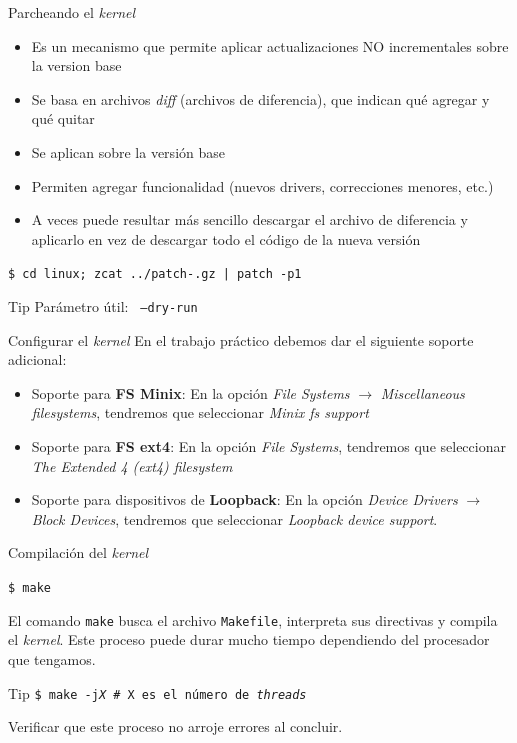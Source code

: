 \begin{frame}{Parcheando el \textit{kernel}}
\begin{itemize}
\item Es un mecanismo que permite aplicar actualizaciones NO incrementales sobre la version base
\item Se basa en archivos \textit{diff} (archivos de diferencia), que indican qué agregar y qué quitar
\item Se aplican sobre la versión base
\item Permiten agregar funcionalidad (nuevos drivers, correcciones menores, etc.)
\item A veces puede resultar más sencillo descargar el archivo de diferencia y aplicarlo en vez de descargar todo el código de la nueva versión
\end{itemize}
\pause
\begin{block}{}
    \texttt{\$ cd linux; zcat ../patch-\PATCHEDKERNELVERSION.gz | patch -p1}
\end{block}

\begin{block}{Tip}
  Parámetro útil:
  \texttt{\ --dry-run}
\end{block}

\end{frame}


\begin{frame}{Configurar el \textit{kernel}}
  En el trabajo práctico debemos dar el siguiente soporte adicional:
  \begin{itemize}

  \item Soporte para \textbf{FS Minix}: En la opción \textit{File Systems}
    $\to$ \textit{Miscellaneous filesystems}, tendremos que seleccionar
    \textit{Minix fs support}

  \item Soporte para \textbf{FS ext4}: En la opción \textit{File Systems},
    tendremos que seleccionar \textit{The Extended 4 (ext4) filesystem}

  \item Soporte para dispositivos de \textbf{Loopback}: En la opción
    \textit{Device Drivers} $\to$ \textit{Block Devices}, tendremos que
    seleccionar \textit{Loopback device support}.
  \end{itemize}
\end{frame}

\begin{frame}{Compilación del \textit{kernel}}
\begin{block}{}
  \texttt{\$ make} 
\end{block}
El comando \texttt{make} busca el archivo \texttt{Makefile}, interpreta sus
directivas y compila el \textit{kernel}. Este proceso puede durar mucho
tiempo dependiendo del procesador que tengamos.

\begin{block}{Tip}
\texttt{\$ make -j\textit{X} \# X es el número de \textit{threads}}
\end{block}

Verificar que este proceso no arroje errores al concluir.
\end{frame}

